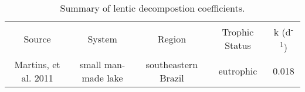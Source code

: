 \begin{table}
\label{tab:k_summary}
\begin{tabular}{c c c c c}
Source               & System              & Region              & Trophic Status & k (d\textsuperscript{-1}) \\
Martins, et al. 2011 & small man-made lake & southeastern Brazil & eutrophic      & 0.018 \\



\end{tabular}
\caption{Summary of lentic decompostion coefficients.}
\end{table}